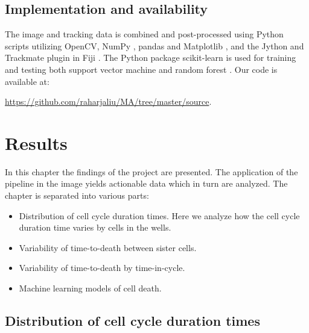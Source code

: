 \documentclass[pdftex,12pt,a4paper]{report}
\begin{document}
\section{Implementation and availability}

The image and tracking data is combined and post-processed using Python scripts utilizing OpenCV\cite{bradski2008learning}, NumPy \cite{walt2011numpy}, pandas \cite{mckinney2010data} and Matplotlib \cite{hunter2007matplotlib}, and the Jython and Trackmate \cite{tinevez2017trackmate, pedroni2002jython} plugin in Fiji \cite{schindelin2012fiji}. The Python package scikit-learn is used for training and testing both support vector machine and random forest \cite{scikit-learn}. Our code is available at:

\href{https://github.com/raharjaliu/MA/tree/master/source}{https://github.com/raharjaliu/MA/tree/master/source}.

\chapter{Results}


In this chapter the findings of the project are presented. The application of the pipeline in the image yields actionable data which in turn are analyzed. The chapter is separated into various parts:

\begin{itemize}
\item Distribution of cell cycle duration times. Here we analyze how the cell cycle duration time varies by cells in the wells.
\item Variability of time-to-death between sister cells.
\item Variability of time-to-death by time-in-cycle.
\item Machine learning models of cell death.
\end{itemize}

\section{Distribution of cell cycle duration times}
\end{document}
